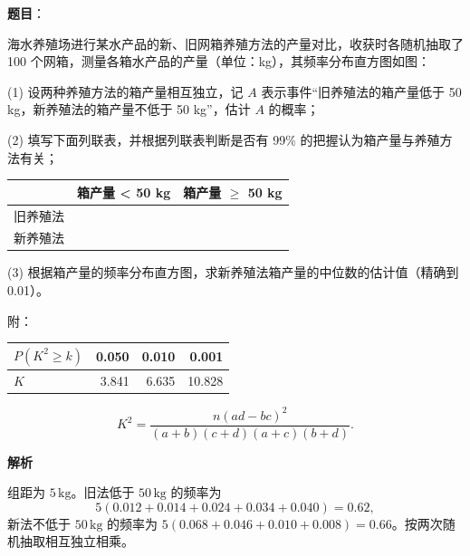 \begin{answer}

\textbf{题目}：

海水养殖场进行某水产品的新、旧网箱养殖方法的产量对比，收获时各随机抽取了 100 个网箱，测量各箱水产品的产量（单位：kg），其频率分布直方图如图：
\nopagebreak[4]
\begin{center}\end{center}
\nopagebreak[4]
   (1) 设两种养殖方法的箱产量相互独立，记 \(A\) 表示事件“旧养殖法的箱产量低于 50 kg，新养殖法的箱产量不低于 50 kg”，估计 \(A\) 的概率；

   (2) 填写下面列联表，并根据列联表判断是否有 99\% 的把握认为箱产量与养殖方法有关；

\begin{center}
\begin{tabular}{lrr}
\toprule
 & 箱产量 < 50 kg & 箱产量 $\geq$ 50 kg \\
\midrule
旧养殖法 &  &  \\
新养殖法 &  &  \\
\bottomrule
\end{tabular}
\end{center}

   (3) 根据箱产量的频率分布直方图，求新养殖法箱产量的中位数的估计值（精确到 0.01）。

   附：

\begin{center}
\begin{tabular}{lrrr}
\toprule
\(P(K^2\geq k)\) & 0.050 & 0.010 & 0.001 \\
\midrule
\(K\) & 3.841 & 6.635 & 10.828 \\
\bottomrule
\end{tabular}
\end{center}

\nopagebreak[4]
\[
   K^2=\frac{n(ad-bc)^2}{(a+b)(c+d)(a+c)(b+d)}.
\]


\textbf{解析}


组距为 \(5\,\mathrm{kg}\)。旧法低于 \(50\,\mathrm{kg}\) 的频率为
\nopagebreak[4]
\[
5(0.012+0.014+0.024+0.034+0.040)=0.62,
\]
新法不低于 \(50\,\mathrm{kg}\) 的频率为 \(5(0.068+0.046+0.010+0.008)=0.66\)。按两次随机抽取相互独立相乘。



\end{answer}
